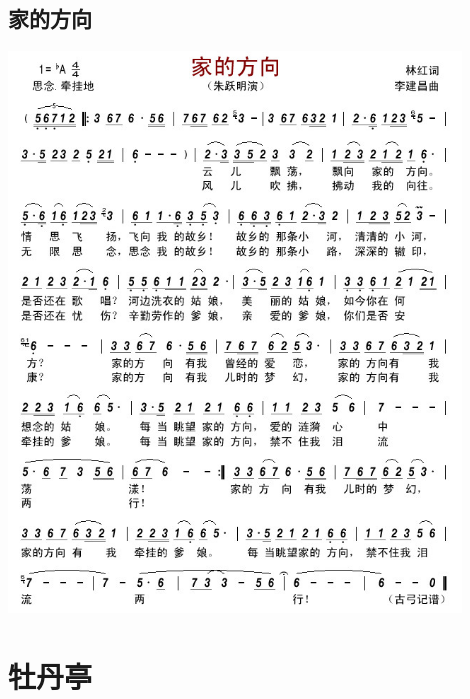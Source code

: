 \documentclass[cn,pad,twocol]{elegantbook}
\begin{document}
\section{家的方向}  \includegraphics[width=0.9\textwidth]{rpi400/20210130家的方向.jpg}

\chapter{牡丹亭}
\end{document}
